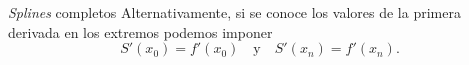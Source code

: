 \begin{frame}{\textit{Splines} completos}
  Alternativamente, si se conoce los valores de la primera derivada en los
  extremos podemos imponer
  \[
    S'(x_0) = f'(x_0) \quad \text{y} \quad S'(x_n) = f'(x_n).
  \]
\end{frame}
